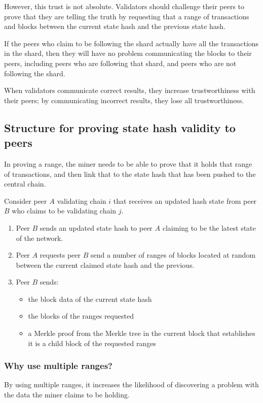 \documentclass[a4paper,12pt]{article}
\begin{document}
However, this trust is not absolute. Validators should challenge their peers to prove that they are telling the truth by requesting that a range of transactions and blocks between the current state hash and the previous state hash.

If the peers who claim to be following the shard actually have all the transactions in the shard, then they will have no problem communicating the blocks to their peers, including peers who are following that shard, and peers who are not following the shard.

When validators communicate correct results, they increase trustworthiness with their peers; by communicating incorrect results, they lose all trustworthiness. 

\subsection{Structure for proving state hash validity to peers}
In proving a range, the miner needs to be able to prove that it holds that range of transactions, and then link that to the state hash that has been pushed to the central chain.

Consider peer $A$ validating chain $i$ that receives an updated hash state from peer $B$ who claims to be validating chain $j$. 

\begin{enumerate}
  \item Peer $B$ sends an updated state hash to peer $A$ claiming to be the latest state of the network. 

  \item Peer $A$ requests peer $B$ send a number of ranges of blocks located at random between the current claimed state hash and the previous. 

  \item Peer $B$ sends:
  \begin{itemize}
    \item the block data of the current state hash
    \item the blocks of the ranges requested
    \item a Merkle proof from the Merkle tree in the current block that establishes it is a child block of the requested ranges
  \end{itemize}
\end{enumerate}


\subsubsection{Why use multiple ranges?}
By using multiple ranges, it increases the likelihood of discovering a problem with the data the miner claims to be holding.
\end{document}
